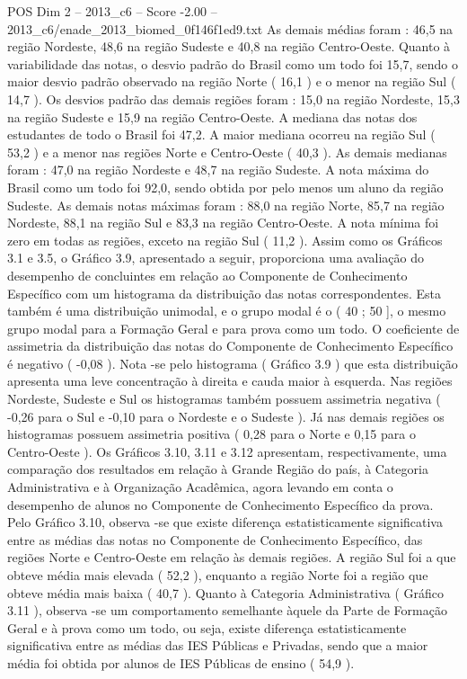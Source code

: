 \begin{textsample}{POS Dim 2 – 2013\_c6 – Score -2.00 – 2013\_c6/enade\_2013\_biomed\_0f146f1ed9.txt}
As demais médias foram : 46,5 na região Nordeste, 48,6 na região Sudeste e 40,8 na região Centro-Oeste.
Quanto à variabilidade das notas, o desvio padrão do Brasil como um todo foi 15,7, sendo o maior desvio padrão observado na região Norte ( 16,1 ) e o menor na região Sul ( 14,7 ).
Os desvios padrão das demais regiões foram : 15,0 na região Nordeste, 15,3 na região Sudeste e 15,9 na região Centro-Oeste.
A mediana das notas dos estudantes de todo o Brasil foi 47,2.
A maior mediana ocorreu na região Sul ( 53,2 ) e a menor nas regiões Norte e Centro-Oeste ( 40,3 ).
As demais medianas foram : 47,0 na região Nordeste e 48,7 na região Sudeste.
A nota máxima do Brasil como um todo foi 92,0, sendo obtida por pelo menos um aluno da região Sudeste.
As demais notas máximas foram : 88,0 na região Norte, 85,7 na região Nordeste, 88,1 na região Sul e 83,3 na região Centro-Oeste.
A nota mínima foi zero em todas as regiões, exceto na região Sul ( 11,2 ).
Assim como os Gráficos 3.1 e 3.5, o Gráfico 3.9, apresentado a seguir, proporciona uma avaliação do desempenho de concluintes em relação ao Componente de Conhecimento Específico com um histograma da distribuição das notas correspondentes.
Esta também é uma distribuição unimodal, e o grupo modal é o ( 40 ; 50 ], o mesmo grupo modal para a Formação Geral e para prova como um todo.
O coeficiente de assimetria da distribuição das notas do Componente de Conhecimento Específico é negativo ( -0,08 ).
Nota -se pelo histograma ( Gráfico 3.9 ) que esta distribuição apresenta uma leve concentração à direita e cauda maior à esquerda.
Nas regiões Nordeste, Sudeste e Sul os histogramas também possuem assimetria negativa ( -0,26 para o Sul e -0,10 para o Nordeste e o Sudeste ).
Já nas demais regiões os histogramas possuem assimetria positiva ( 0,28 para o Norte e 0,15 para o Centro-Oeste ).
Os Gráficos 3.10, 3.11 e 3.12 apresentam, respectivamente, uma comparação dos resultados em relação à Grande Região do país, à Categoria Administrativa e à Organização Acadêmica, agora levando em conta o desempenho de alunos no Componente de Conhecimento Específico da prova.
Pelo Gráfico 3.10, observa -se que existe diferença estatisticamente significativa entre as médias das notas no Componente de Conhecimento Específico, das regiões Norte e Centro-Oeste em relação às demais regiões.
A região Sul foi a que obteve média mais elevada ( 52,2 ), enquanto a região Norte foi a região que obteve média mais baixa ( 40,7 ).
Quanto à Categoria Administrativa ( Gráfico 3.11 ), observa -se um comportamento semelhante àquele da Parte de Formação Geral e à prova como um todo, ou seja, existe diferença estatisticamente significativa entre as médias das IES Públicas e Privadas, sendo que a maior média foi obtida por alunos de IES Públicas de ensino ( 54,9 ).

\end{textsample}
